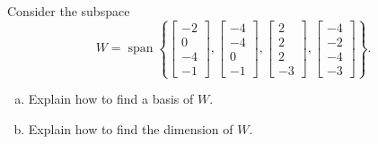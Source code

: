 
\begin{exerciseStatement}


Consider the subspace \[W=\operatorname{span}  \left\{ \left[\begin{array}{c}
-2 \\
0 \\
-4 \\
-1
\end{array}\right] , \left[\begin{array}{c}
-4 \\
-4 \\
0 \\
-1
\end{array}\right] , \left[\begin{array}{c}
2 \\
2 \\
2 \\
-3
\end{array}\right] , \left[\begin{array}{c}
-4 \\
-2 \\
-4 \\
-3
\end{array}\right] \right\} .\]


\begin{enumerate}[(a)]
\item  Explain how to find a basis of \(W\).
\item  Explain how to find the dimension of \(W\).
\end{enumerate}
    
\end{exerciseStatement}
    
